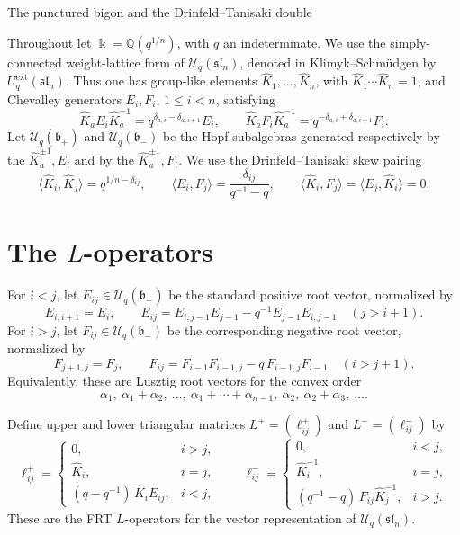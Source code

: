\documentclass[11pt]{article}
\newcommand{\kfield}{\Bbbk}
\newcommand{\Uc}{\mathcal U}
\newcommand{\fb}{\mathfrak b}
\newcommand{\slfr}{\mathfrak{sl}}
\begin{document}
\begin{center}
{\Large The punctured bigon and the Drinfeld--Tanisaki double}
\end{center}

\bigskip

\noindent
Throughout let \(\kfield=\mathbb Q(q^{1/n})\), with \(q\) an indeterminate.  We use the simply-connected weight-lattice form of \(\Uc_q(\slfr_n)\), denoted in Klimyk--Schm\"udgen by \(U_q^{\mathrm{ext}}(\slfr_n)\).  Thus one has group-like elements \(\widehat K_1,\ldots,\widehat K_n\), with \(\widehat K_1\cdots \widehat K_n=1\), and Chevalley generators \(E_i,F_i\), \(1\leq i<n\), satisfying
\[
\widehat K_a E_i\widehat K_a^{-1}
=q^{\delta_{a,i}-\delta_{a,i+1}}E_i,\qquad
\widehat K_a F_i\widehat K_a^{-1}
=q^{-\delta_{a,i}+\delta_{a,i+1}}F_i .
\]
Let \(\Uc_q(\fb_+)\) and \(\Uc_q(\fb_-)\) be the Hopf subalgebras generated respectively by the \(\widehat K_a^{\pm1},E_i\) and by the \(\widehat K_a^{\pm1},F_i\).  We use the Drinfeld--Tanisaki skew pairing
\[
\langle \widehat K_i,\widehat K_j\rangle
=q^{1/n-\delta_{ij}},\qquad
\langle E_i,F_j\rangle=\frac{\delta_{ij}}{q^{-1}-q},\qquad
\langle \widehat K_i,F_j\rangle
=\langle E_j,\widehat K_i\rangle=0 .
\]

\section{The \(L\)-operators}

For \(i<j\), let \(E_{ij}\in \Uc_q(\fb_+)\) be the standard positive root vector, normalized by
\[
E_{i,i+1}=E_i,\qquad
E_{ij}=E_{i,j-1}E_{j-1}-q^{-1}E_{j-1}E_{i,j-1}\quad (j>i+1).
\]
For \(i>j\), let \(F_{ij}\in \Uc_q(\fb_-)\) be the corresponding negative root vector, normalized by
\[
F_{j+1,j}=F_j,\qquad
F_{ij}=F_{i-1}F_{i-1,j}-q\,F_{i-1,j}F_{i-1}\quad (i>j+1).
\]
Equivalently, these are Lusztig root vectors for the convex order
\[
\alpha_1,\ \alpha_1+\alpha_2,\ \ldots,\ \alpha_1+\cdots+\alpha_{n-1},\
\alpha_2,\ \alpha_2+\alpha_3,\ \ldots .
\]

Define upper and lower triangular matrices \(L^+=(\ell^+_{ij})\) and \(L^-=(\ell^-_{ij})\) by
\[
\ell^+_{ij}=
\begin{cases}
0,& i>j,\\[2mm]
\widehat K_i,& i=j,\\[2mm]
(q-q^{-1})\,\widehat K_i E_{ij},& i<j,
\end{cases}
\qquad
\ell^-_{ij}=
\begin{cases}
0,& i<j,\\[2mm]
\widehat K_i^{-1},& i=j,\\[2mm]
(q^{-1}-q)\,F_{ij}\widehat K_j^{-1},& i>j .
\end{cases}
\]
These are the FRT \(L\)-operators for the vector representation of \(\Uc_q(\slfr_n)\).
\end{document}
